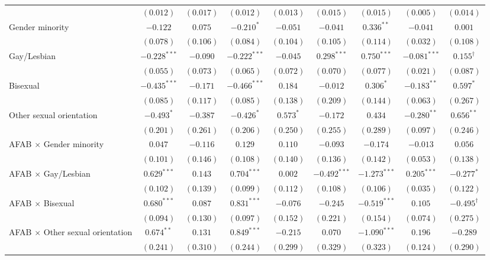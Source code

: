\begin{table}[htpb]
{\begin{tabular}{l c c c c c c c c}
 & $(0.012)$ & $(0.017)$ & $(0.012)$ & $(0.013)$ & $(0.015)$ & $(0.015)$ & $(0.005)$ & $(0.014)$ \\
Gender minority & $-0.122$ & $0.075$ & $-0.210^{*}$ & $-0.051$ & $-0.041$ & $0.336^{**}$ & $-0.041$ & $0.001$ \\
 & $(0.078)$ & $(0.106)$ & $(0.084)$ & $(0.104)$ & $(0.105)$ & $(0.114)$ & $(0.032)$ & $(0.108)$ \\
Gay/Lesbian & $-0.228^{***}$ & $-0.090$ & $-0.222^{***}$ & $-0.045$ & $0.298^{***}$ & $0.750^{***}$ & $-0.081^{***}$ & $0.155^{\dagger}$ \\
 & $(0.055)$ & $(0.073)$ & $(0.065)$ & $(0.072)$ & $(0.070)$ & $(0.077)$ & $(0.021)$ & $(0.087)$ \\
Bisexual & $-0.435^{***}$ & $-0.171$ & $-0.466^{***}$ & $0.184$ & $-0.012$ & $0.306^{*}$ & $-0.183^{**}$ & $0.597^{*}$ \\
 & $(0.085)$ & $(0.117)$ & $(0.085)$ & $(0.138)$ & $(0.209)$ & $(0.144)$ & $(0.063)$ & $(0.267)$ \\
Other sexual orientation & $-0.493^{*}$ & $-0.387$ & $-0.426^{*}$ & $0.573^{*}$ & $-0.172$ & $0.434$ & $-0.280^{**}$ & $0.656^{**}$ \\
 & $(0.201)$ & $(0.261)$ & $(0.206)$ & $(0.250)$ & $(0.255)$ & $(0.289)$ & $(0.097)$ & $(0.246)$ \\
AFAB $\times$ Gender minority & $0.047$ & $-0.116$ & $0.129$ & $0.110$ & $-0.093$ & $-0.174$ & $-0.013$ & $0.056$ \\
 & $(0.101)$ & $(0.146)$ & $(0.108)$ & $(0.140)$ & $(0.136)$ & $(0.142)$ & $(0.053)$ & $(0.138)$ \\
AFAB $\times$ Gay/Lesbian & $0.629^{***}$ & $0.143$ & $0.704^{***}$ & $0.002$ & $-0.492^{***}$ & $-1.273^{***}$ & $0.205^{***}$ & $-0.277^{*}$ \\
 & $(0.102)$ & $(0.139)$ & $(0.099)$ & $(0.112)$ & $(0.108)$ & $(0.106)$ & $(0.035)$ & $(0.122)$ \\
AFAB $\times$ Bisexual & $0.680^{***}$ & $0.087$ & $0.831^{***}$ & $-0.076$ & $-0.245$ & $-0.519^{***}$ & $0.105$ & $-0.495^{\dagger}$ \\
 & $(0.094)$ & $(0.130)$ & $(0.097)$ & $(0.152)$ & $(0.221)$ & $(0.154)$ & $(0.074)$ & $(0.275)$ \\
AFAB $\times$ Other sexual orientation & $0.674^{**}$ & $0.131$ & $0.849^{***}$ & $-0.215$ & $0.070$ & $-1.090^{***}$ & $0.196$ & $-0.289$ \\
 & $(0.241)$ & $(0.310)$ & $(0.244)$ & $(0.299)$ & $(0.329)$ & $(0.323)$ & $(0.124)$ & $(0.290)$ \\

\end{tabular}}
\end{table}
